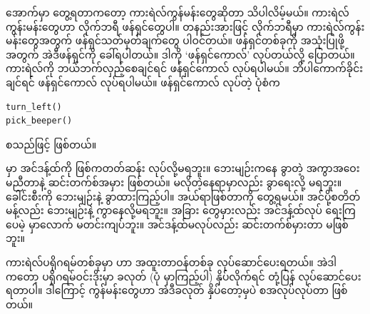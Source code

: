  အောက်မှာ တွေ့ရတာကတော့ ကားရဲလ်ကွန်မန်းတွေဆိုတာ သိပါလိမ့်မယ်။ ကားရဲလ်ကွန်းမန်းတွေဟာ  လိုက်ဘရီ ဖန်ရှင်တွေပါ။ တနည်းအားဖြင့်  လိုက်ဘရီမှာ ကားရဲလ်ကွန်းမန်းတွေအတွက် ဖန်ရှင်သတ်မှတ်ချက်တွေ ပါဝင်တယ်။ ဖန်ရှင်တစ်ခုကို အသုံးပြုဖို့အတွက် အဲဒီဖန်ရှင်ကို ခေါ်ရပါတယ်။ ဒါကို   ‘ဖန်ရှင်ကောလ်’ လုပ်တယ်လို့ ပြောတယ်။ ကားရဲလ်ကို ဘယ်ဘက်လှည့်စေချင်ရင်  ဖန်ရှင်ကောလ် လုပ်ရပါမယ်။ ဘိပါကောက်ခိုင်းချင်ရင်  ဖန်ရှင်ကောလ် လုပ်ရပါမယ်။ ဖန်ရှင်ကောလ် လုပ်တဲ့ ပုံစံက
%
\setlength{\fboxsep}{0pt}
\begin{verbatim}
turn_left()
pick_beeper()
\end{verbatim}
စသည်ဖြင့် ဖြစ်တယ်။

\begin{mytcbox}
 မှာ အင်ဒန့်ထ်ကို ဖြစ်ကတတ်ဆန်း လုပ်လို့မရဘူး။ ဘေးမျဉ်းကနေ ခွာတဲ့ အကွာအဝေး မညီတာနဲ့ ဆင်းတက်စ်အမှား ဖြစ်တယ်။ မလိုတဲ့နေရာမှာလည်း ခွာရေးလို့ မရဘူး။ ခေါင်းစီးကို ဘေးမျဉ်းနဲ့ ခွာထားကြည့်ပါ။ အယ်ရာဖြစ်တာကို တွေ့ရမယ်။ အင်ပို့စတိတ်မန့်လည်း ဘေးမျဉ်းနဲ့ ကွာနေလို့မရဘူး။ အခြား  တွေမှားလည်း အင်ဒန့်ထ်လုပ် ရေးကြပေမဲ့  မှာလောက် မတင်းကျပ်ဘူး။ အင်ဒန့်ထ်မလုပ်လည်း ဆင်းတက်စ်မှားတာ မဖြစ်ဘူး။
\end{mytcbox}

ကားရဲလ်ပရိုဂရမ်တစ်ခုမှာ  ဟာ  အထူးတာဝန်တစ်ခု လုပ်ဆောင်ပေးရတယ်။ အဲဒါကတော့ ပရိုဂရမ်ဝင်းဒိုးမှာ   ခလုတ် (ပုံ \fRefNo{\ref{fig:mtkrlprgm1}} မှာကြည့်ပါ) နှိပ်လိုက်ရင် တုံ့ပြန် လုပ်ဆောင်ပေးရတာပါ။ ဒါကြောင့် ကွန်မန်းတွေဟာ အဲဒီခလုတ် နှိပ်တော့မှပဲ စအလုပ်လုပ်တာ ဖြစ်တယ်။

